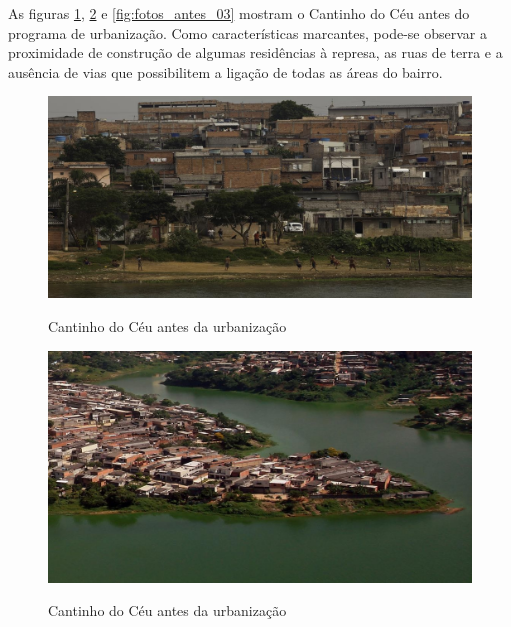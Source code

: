	As figuras \ref{fig:fotos_antes_01}, \ref{fig:fotos_antes_02} e \ref{fig:fotos_antes_03} mostram o Cantinho do Céu antes do programa de urbanização. Como características marcantes, pode-se observar a proximidade de construção de algumas residências à represa, as ruas de terra e a ausência de vias que possibilitem a ligação de todas as áreas do bairro.
	
	\begin{figure}[hb]
		\centering
		\caption{Cantinho do Céu antes da urbanização}
		\includegraphics[width=\linewidth]{img/knoll_antes01}
		\label{fig:fotos_antes_01}
	\end{figure}
	
	\begin{figure}[hb]
		\centering
		\caption{Cantinho do Céu antes da urbanização}
		\includegraphics[width=\linewidth]{img/knoll_antes02}
		\label{fig:fotos_antes_02}
	\end{figure}
	

